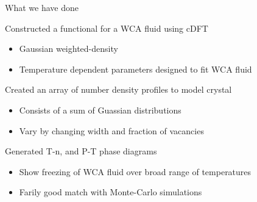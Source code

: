 \documentclass{beamer}
\begin{document}
\begin{frame}{What we have done}
        \begin{block}{Constructed a functional for a WCA fluid using cDFT}
            \begin{itemize}
              \item Gaussian weighted-density  
              \item Temperature dependent parameters designed to fit WCA fluid
           \end{itemize}
        \end{block}
        \begin{block}{Created an array of number density profiles to model crystal}
           \begin{itemize}
              \item Consists of a sum of Guassian distributions %
              \item Vary by changing width and fraction of vacancies
           \end{itemize}
         \end{block}
         \begin{block}{Generated T-n, and P-T phase diagrams}
           \begin{itemize}
              \item Show freezing of WCA fluid over broad range of temperatures
              \item Farily good match with Monte-Carlo simulations
           \end{itemize}
         \end{block}
\end{frame}




\end{document}
